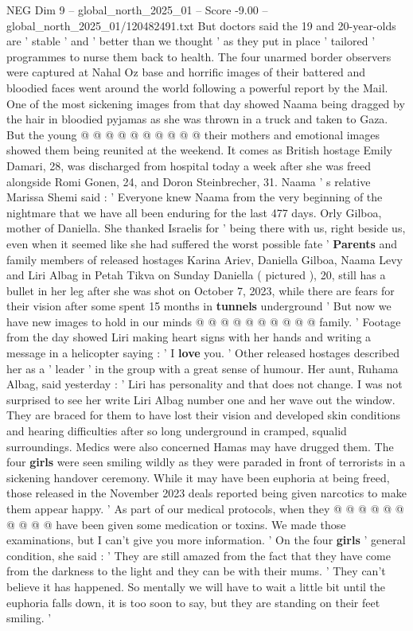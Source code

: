 \begin{textsample}{NEG Dim 9 – global\_north\_2025\_01 – Score -9.00 – global\_north\_2025\_01/120482491.txt}
But doctors said the 19 and 20-year-olds are ' stable ' and ' better than we thought ' as they put in place ' tailored ' programmes to nurse them back to health.
The four unarmed border observers were captured at Nahal Oz base and horrific images of their battered and bloodied faces went around the world following a powerful report by the Mail.
One of the most sickening images from that day showed Naama being dragged by the hair in bloodied pyjamas as she was thrown in a truck and taken to Gaza.
But the young @ @ @ @ @ @ @ @ @ @ their mothers and emotional images showed them being reunited at the weekend.
It comes as British hostage Emily Damari, 28, was discharged from hospital today a week after she was freed alongside Romi Gonen, 24, and Doron Steinbrecher, 31.
Naama ' s relative Marissa Shemi said : ' Everyone knew Naama from the very beginning of the nightmare that we have all been enduring for the last 477 days.
Orly Gilboa, mother of Daniella.
She thanked Israelis for ' being there with us, right beside us, even when it seemed like she had suffered the worst possible fate ' \textbf{Parents} and family members of released hostages Karina Ariev, Daniella Gilboa, Naama Levy and Liri Albag in Petah Tikva on Sunday Daniella ( pictured ), 20, still has a bullet in her leg after she was shot on October 7, 2023, while there are fears for their vision after some spent 15 months in \textbf{tunnels} underground ' But now we have new images to hold in our minds @ @ @ @ @ @ @ @ @ @ family. ' Footage from the day showed Liri making heart signs with her hands and writing a message in a helicopter saying : ' I \textbf{love} you. ' Other released hostages described her as a ' leader ' in the group with a great sense of humour.
Her aunt, Ruhama Albag, said yesterday : ' Liri has personality and that does not change.
I was not surprised to see her write Liri Albag number one and her wave out the window.
They are braced for them to have lost their vision and developed skin conditions and hearing difficulties after so long underground in cramped, squalid surroundings.
Medics were also concerned Hamas may have drugged them.
The four \textbf{girls} were seen smiling wildly as they were paraded in front of terrorists in a sickening handover ceremony.
While it may have been euphoria at being freed, those released in the November 2023 deals reported being given narcotics to make them appear happy. ' As part of our medical protocols, when they @ @ @ @ @ @ @ @ @ @ have been given some medication or toxins.
We made those examinations, but I can't give you more information. ' On the four \textbf{girls} ' general condition, she said : ' They are still amazed from the fact that they have come from the darkness to the light and they can be with their mums. ' They can't believe it has happened.
So mentally we will have to wait a little bit until the euphoria falls down, it is too soon to say, but they are standing on their feet smiling. '

\end{textsample}
